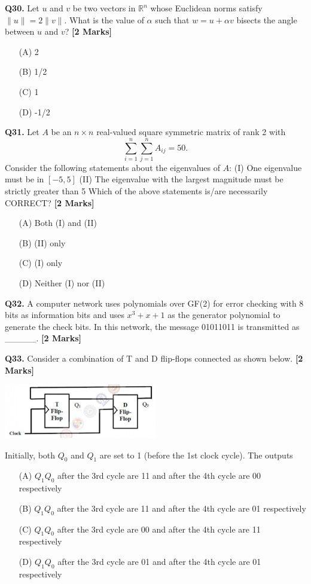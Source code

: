 \documentclass[11pt]{article}
\newcommand{\questionb}[2]{
    \noindent\textbf{Q#2.} #1 \hfill \textbf{[2 Marks]}
}
\begin{document}
\questionb{Let \( u \) and \( v \) be two vectors in \( \mathbb{R}^n \) whose Euclidean norms satisfy \( \|u\| = 2\|v\| \).  
What is the value of \( \alpha \) such that \( w = u + \alpha v \) bisects the angle between \( u \) and \( v \)?}{30}
\begin{enumerate}
    \item[(A)] 2  
    \item[(B)] 1/2  
    \item[(C)] 1  
    \item[(D)] -1/2  
\end{enumerate}
\vspace{0.5cm}

\questionb{Let \( A \) be an \( n \times n \) real-valued square symmetric matrix of rank 2 with  
\[
\sum_{i=1}^{n} \sum_{j=1}^{n} A_{ij} = 50.
\]  
Consider the following statements about the eigenvalues of \( A \):  
(I) One eigenvalue must be in \( [-5, 5] \)  
(II) The eigenvalue with the largest magnitude must be strictly greater than 5  
Which of the above statements is/are necessarily CORRECT?}{31}
\begin{enumerate}
    \item[(A)] Both (I) and (II)  
    \item[(B)] (II) only  
    \item[(C)] (I) only  
    \item[(D)] Neither (I) nor (II)  
\end{enumerate}
\vspace{0.5cm}

\questionb{A computer network uses polynomials over GF(2) for error checking with 8 bits as information bits and uses \( x^3 + x + 1 \) as the generator polynomial to generate the check bits.  
In this network, the message 01011011 is transmitted as \_\_\_\_\_.}{32}
\vspace{0.5cm}

\questionb{Consider a combination of T and D flip-flops connected as shown below.}{33}
\begin{center}
\includegraphics[width=0.5\textwidth]{figures/33.png}
\end{center}
Initially, both \( Q_0 \) and \( Q_1 \) are set to 1 (before the 1st clock cycle). The outputs
\begin{enumerate}
    \item[(A)] \( Q_1 Q_0 \) after the 3rd cycle are 11 and after the 4th cycle are 00 respectively  
    \item[(B)] \( Q_1 Q_0 \) after the 3rd cycle are 11 and after the 4th cycle are 01 respectively  
    \item[(C)] \( Q_1 Q_0 \) after the 3rd cycle are 00 and after the 4th cycle are 11 respectively  
    \item[(D)] \( Q_1 Q_0 \) after the 3rd cycle are 01 and after the 4th cycle are 01 respectively  
\end{enumerate}
\vspace{0.5cm}
\end{document}
